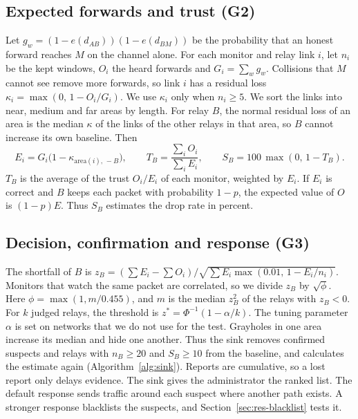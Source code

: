 \documentclass[11pt]{article}
\begin{document}
\subsection{Expected forwards and trust (G2)}\label{sec:prop-trust}
\noindent
Let $g_w = (1-e(d_{AB}))(1-e(d_{BM}))$ be the probability that an honest forward reaches $M$ on the channel alone.
For each monitor and relay link $i$, let $n_i$ be the kept windows, $O_i$ the heard forwards and $G_i = \sum_w g_w$.
Collisions that $M$ cannot see remove more forwards, so link $i$ has a residual loss $\kappa_i = \max(0,\, 1 - O_i/G_i)$.
We use $\kappa_i$ only when $n_i \geq 5$.
We sort the links into near, medium and far areas by length.
For relay $B$, the normal residual loss of an area is the median $\kappa$ of the links of the other relays in that area, so $B$ cannot increase its own baseline. Then
\begin{equation}
E_i = G_i\bigl(1-\kappa_{\mathrm{area}(i),\,-B}\bigr), \qquad
T_B = \frac{\sum_i O_i}{\sum_i E_i}, \qquad
S_B = 100\,\max(0,\, 1 - T_B).
\end{equation}
$T_B$ is the average of the trust $O_i/E_i$ of each monitor, weighted by $E_i$.
If $E_i$ is correct and $B$ keeps each packet with probability $1-p$, the expected value of $O$ is $(1-p)E$.
Thus $S_B$ estimates the drop rate in percent.

\subsection{Decision, confirmation and response (G3)}\label{sec:prop-decision}
\noindent
The shortfall of $B$ is $z_B = (\sum E_i - \sum O_i)/\sqrt{\sum E_i \max(0.01,\, 1 - E_i/n_i)}$.
Monitors that watch the same packet are correlated, so we divide $z_B$ by $\sqrt{\phi}$.
Here $\phi = \max(1, m/0.455)$, and $m$ is the median $z_B^2$ of the relays with $z_B < 0$.
For $k$ judged relays, the threshold is $z^* = \Phi^{-1}(1-\alpha/k)$.
The tuning parameter $\alpha$ is set on networks that we do not use for the test.
Grayholes in one area increase its median and hide one another.
Thus the sink removes confirmed suspects and relays with $n_B \geq 20$ and $S_B \geq 10$ from the baseline, and calculates the estimate again (Algorithm~\ref{alg:sink}).
Reports are cumulative, so a lost report only delays evidence.
The sink gives the administrator the ranked list.
The default response sends traffic around each suspect where another path exists.
A stronger response blacklists the suspects, and Section~\ref{sec:res-blacklist} tests it.
\end{document}
